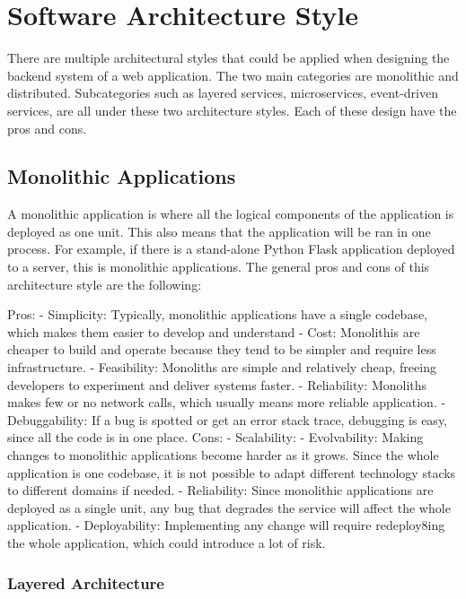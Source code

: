 \chapter{Software Architecture Style}\label{text}

There are multiple architectural styles that could be applied when designing the backend system of a web application.
The two main categories are monolithic and distributed. Subcategories such as layered services, microservices, event-driven services, are all under 
these two architecture styles. Each of these design have the pros and cons.

\section[Monolithic Applications]{Monolithic Applications}\label{sec:newsec}

A monolithic application is where all the logical components of the application is deployed as one unit. 
This also means that the application will be ran in one process. For example, if there is a stand-alone Python Flask application deployed to a server, 
this is monolithic applications. The general pros and cons of this architecture style are the following:

Pros:
-	Simplicity: Typically, monolithic applications have a single codebase, which makes them easier to develop and understand
-	Cost: Monolithis are cheaper to build and operate because they tend to be simpler and require less infrastructure.
-	Feasibility: Monoliths are simple and relatively cheap, freeing developers to experiment and deliver systems faster.
-	Reliability: Monoliths makes few or no network calls, which usually means more reliable application.
-	Debuggability: If a bug is spotted or get an error stack trace, debugging is easy, since all the code is in one place.
Cons: 
-	Scalability: 
-	Evolvability: Making changes to monolithic applications become harder as it grows. Since the whole application is one codebase, 
  it is not possible to adapt different technology stacks to different domains if needed.
-	Reliability: Since monolithic applications are deployed as a single unit, any bug that degrades the service will affect the whole application.
-	Deployability: Implementing any change will require redeploy8ing the whole application, which could introduce a lot of risk.

\subsection[Layered Architecture]{Layered Architecture}

